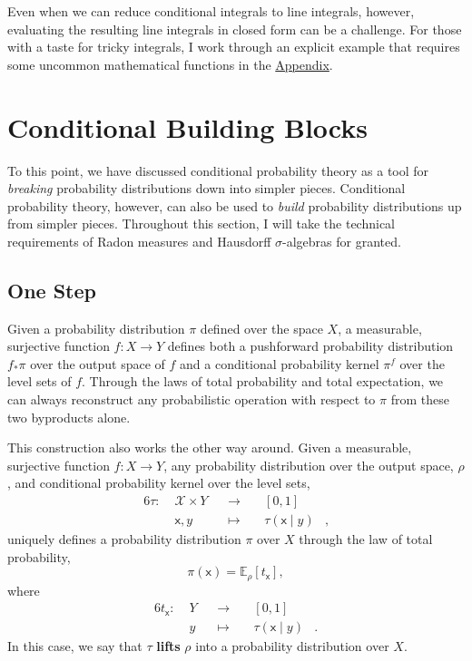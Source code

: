 \documentclass[
  letterpaper,
  DIV=11,
  numbers=noendperiod]{scrartcl}
\begin{document}
Even when we can reduce conditional integrals to line integrals,
however, evaluating the resulting line integrals in closed form can be a
challenge. For those with a taste for tricky integrals, I work through
an explicit example that requires some uncommon mathematical functions
in the \hyperref[sec:appendix]{Appendix}.

\section{Conditional Building Blocks}\label{conditional-building-blocks}

To this point, we have discussed conditional probability theory as a
tool for \emph{breaking} probability distributions down into simpler
pieces. Conditional probability theory, however, can also be used to
\emph{build} probability distributions up from simpler pieces.
Throughout this section, I will take the technical requirements of Radon
measures and Hausdorff \(\sigma\)-algebras for granted.

\subsection{One Step}\label{one-step}

Given a probability distribution \(\pi\) defined over the space \(X\), a
measurable, surjective function \(f : X \rightarrow Y\) defines both a
pushforward probability distribution \(f_{*} \pi\) over the output space
of \(f\) and a conditional probability kernel \(\pi^{f}\) over the level
sets of \(f\). Through the laws of total probability and total
expectation, we can always reconstruct any probabilistic operation with
respect to \(\pi\) from these two byproducts alone.

This construction also works the other way around. Given a measurable,
surjective function \(f: X \rightarrow Y\), any probability distribution
over the output space, \(\rho\), and conditional probability kernel over
the level sets, \begin{alignat*}{6}
\tau :\; &\mathcal{X} \times Y& &\rightarrow& \; &[0, 1]&
\\
&\mathsf{x}, y& &\mapsto& &\tau ( \mathsf{x} \mid y )&,
\end{alignat*} uniquely defines a probability distribution \(\pi\) over
\(X\) through the law of total probability, \[
\pi( \mathsf{x} ) = \mathbb{E}_{\rho} [ t_{\mathsf{x}} ],
\] where \begin{alignat*}{6}
t_{\mathsf{x}} :\; &Y& &\rightarrow& \; &[0, 1]&
\\
&y& &\mapsto& &\tau ( \mathsf{x} \mid y )&.
\end{alignat*} In this case, we say that \(\tau\) \textbf{lifts}
\(\rho\) into a probability distribution over \(X\).
\end{document}
